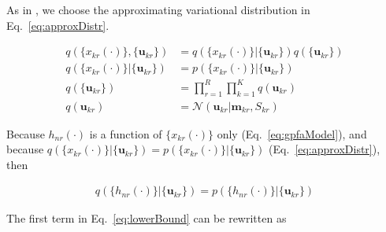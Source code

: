 \documentclass[12pt]{article}
\begin{document}
As in \cite[][supplementary]{dunckerAndSahani18}, we choose the approximating variational distribution in Eq.~\ref{eq:approxDistr}.

\begin{equation}
    \begin{aligned}
        q(\{x_{kr}(\cdot)\}, \{\mathbf{u}_{kr}\})&=q(\{x_{kr}(\cdot)\}|\{\mathbf{u}_{kr}\})q(\{\mathbf{u}_{kr}\})\\
        q(\{x_{kr}(\cdot)\}|\{\mathbf{u}_{kr}\})&=p(\{x_{kr}(\cdot)\}|\{\mathbf{u}_{kr}\})\\
        q(\{\mathbf{u}_{kr}\})&=\prod_{r=1}^R\prod_{k=1}^Kq(\mathbf{u}_{kr})\\
        q(\mathbf{u}_{kr})&=\mathcal{N}(\mathbf{u}_{kr}|\mathbf{m}_{kr},S_{kr})
    \end{aligned}
    \label{eq:approxDistr}
\end{equation}

Because $h_{nr}(\cdot)$ is a function of $\{x_{kr}(\cdot)\}$ only (Eq.~\ref{eq:gpfaModel}), and because $q(\{x_{kr}(\cdot)\}|\{\mathbf{u}_{kr}\})=p(\{x_{kr}(\cdot)\}|\{\mathbf{u}_{kr}\})$ (Eq.~\ref{eq:approxDistr}), then 

\begin{align}
    q(\{h_{nr}(\cdot)\}|\{\mathbf{u}_{kr}\})=p(\{h_{nr}(\cdot)\}|\{\mathbf{u}_{kr}\})
    \label{eq:qH_equals_pH}
\end{align}

The first term in Eq.~\ref{eq:lowerBound} can be rewritten as
\end{document}
